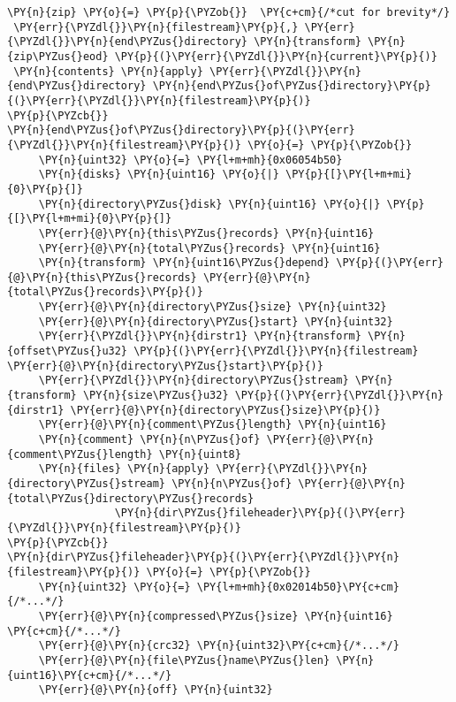 \begin{Verbatim}[commandchars=\\\{\},codes={\catcode`\$=3\catcode`\^=7\catcode`\_=8}]
\PY{n}{zip} \PY{o}{=} \PY{p}{\PYZob{}}  \PY{c+cm}{/*cut for brevity*/}
 \PY{err}{\PYZdl{}}\PY{n}{filestream}\PY{p}{,} \PY{err}{\PYZdl{}}\PY{n}{end\PYZus{}directory} \PY{n}{transform} \PY{n}{zip\PYZus{}eod} \PY{p}{(}\PY{err}{\PYZdl{}}\PY{n}{current}\PY{p}{)}
 \PY{n}{contents} \PY{n}{apply} \PY{err}{\PYZdl{}}\PY{n}{end\PYZus{}directory} \PY{n}{end\PYZus{}of\PYZus{}directory}\PY{p}{(}\PY{err}{\PYZdl{}}\PY{n}{filestream}\PY{p}{)}
\PY{p}{\PYZcb{}}
\PY{n}{end\PYZus{}of\PYZus{}directory}\PY{p}{(}\PY{err}{\PYZdl{}}\PY{n}{filestream}\PY{p}{)} \PY{o}{=} \PY{p}{\PYZob{}} 
     \PY{n}{uint32} \PY{o}{=} \PY{l+m+mh}{0x06054b50}
     \PY{n}{disks} \PY{n}{uint16} \PY{o}{|} \PY{p}{[}\PY{l+m+mi}{0}\PY{p}{]}
     \PY{n}{directory\PYZus{}disk} \PY{n}{uint16} \PY{o}{|} \PY{p}{[}\PY{l+m+mi}{0}\PY{p}{]}
     \PY{err}{@}\PY{n}{this\PYZus{}records} \PY{n}{uint16}
     \PY{err}{@}\PY{n}{total\PYZus{}records} \PY{n}{uint16} 
     \PY{n}{transform} \PY{n}{uint16\PYZus{}depend} \PY{p}{(}\PY{err}{@}\PY{n}{this\PYZus{}records} \PY{err}{@}\PY{n}{total\PYZus{}records}\PY{p}{)}
     \PY{err}{@}\PY{n}{directory\PYZus{}size} \PY{n}{uint32} 
     \PY{err}{@}\PY{n}{directory\PYZus{}start} \PY{n}{uint32}
     \PY{err}{\PYZdl{}}\PY{n}{dirstr1} \PY{n}{transform} \PY{n}{offset\PYZus{}u32} \PY{p}{(}\PY{err}{\PYZdl{}}\PY{n}{filestream} \PY{err}{@}\PY{n}{directory\PYZus{}start}\PY{p}{)} 
     \PY{err}{\PYZdl{}}\PY{n}{directory\PYZus{}stream} \PY{n}{transform} \PY{n}{size\PYZus{}u32} \PY{p}{(}\PY{err}{\PYZdl{}}\PY{n}{dirstr1} \PY{err}{@}\PY{n}{directory\PYZus{}size}\PY{p}{)}
     \PY{err}{@}\PY{n}{comment\PYZus{}length} \PY{n}{uint16}
     \PY{n}{comment} \PY{n}{n\PYZus{}of} \PY{err}{@}\PY{n}{comment\PYZus{}length} \PY{n}{uint8}
     \PY{n}{files} \PY{n}{apply} \PY{err}{\PYZdl{}}\PY{n}{directory\PYZus{}stream} \PY{n}{n\PYZus{}of} \PY{err}{@}\PY{n}{total\PYZus{}directory\PYZus{}records} 
                 \PY{n}{dir\PYZus{}fileheader}\PY{p}{(}\PY{err}{\PYZdl{}}\PY{n}{filestream}\PY{p}{)}
\PY{p}{\PYZcb{}}
\PY{n}{dir\PYZus{}fileheader}\PY{p}{(}\PY{err}{\PYZdl{}}\PY{n}{filestream}\PY{p}{)} \PY{o}{=} \PY{p}{\PYZob{}} 
     \PY{n}{uint32} \PY{o}{=} \PY{l+m+mh}{0x02014b50}\PY{c+cm}{/*...*/}
     \PY{err}{@}\PY{n}{compressed\PYZus{}size} \PY{n}{uint16} \PY{c+cm}{/*...*/}
     \PY{err}{@}\PY{n}{crc32} \PY{n}{uint32}\PY{c+cm}{/*...*/}
     \PY{err}{@}\PY{n}{file\PYZus{}name\PYZus{}len} \PY{n}{uint16}\PY{c+cm}{/*...*/}
     \PY{err}{@}\PY{n}{off} \PY{n}{uint32}

\end{Verbatim}
